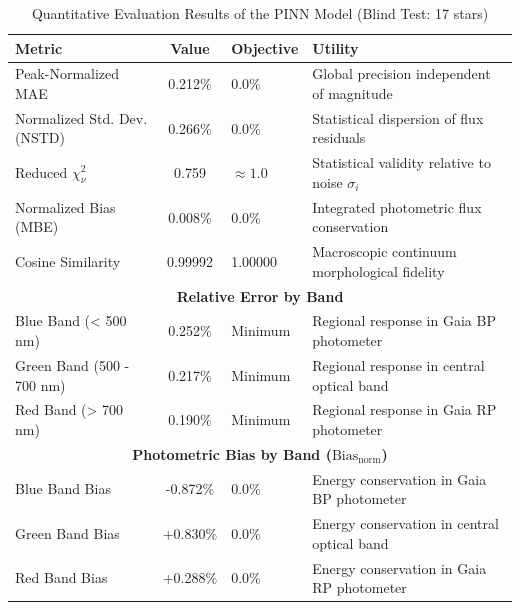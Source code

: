 
\begin{table}[htpb]
\centering
\caption{Quantitative Evaluation Results of the PINN Model (Blind Test: 17 stars)}
\label{tab:pinn_evaluation}
\begin{tabular}{lcll}
\hline
\textbf{Metric} & \textbf{Value} & \textbf{Objective} & \textbf{Utility} \\
\hline
Peak-Normalized MAE & 0.212\% & 0.0\% & Global precision independent of magnitude \\
Normalized Std. Dev. (NSTD) & 0.266\% & 0.0\% & Statistical dispersion of flux residuals \\
Reduced $\chi^2_\nu$ & 0.759 & $\approx 1.0$ & Statistical validity relative to noise $\sigma_i$ \\
Normalized Bias (MBE) & 0.008\% & 0.0\% & Integrated photometric flux conservation \\
Cosine Similarity & 0.99992 & 1.00000 & Macroscopic continuum morphological fidelity \\
\hline
\multicolumn{4}{c}{\textbf{Relative Error by Band}} \\
\hline
Blue Band (< 500 nm) & 0.252\% & Minimum & Regional response in Gaia BP photometer \\
Green Band (500 - 700 nm) & 0.217\% & Minimum & Regional response in central optical band \\
Red Band (> 700 nm) & 0.190\% & Minimum & Regional response in Gaia RP photometer \\
\hline
\multicolumn{4}{c}{\textbf{Photometric Bias by Band ($\text{Bias}_{\text{norm}}$)}} \\
\hline
Blue Band Bias & -0.872\% & 0.0\% & Energy conservation in Gaia BP photometer \\
Green Band Bias & +0.830\% & 0.0\% & Energy conservation in central optical band \\
Red Band Bias & +0.288\% & 0.0\% & Energy conservation in Gaia RP photometer \\
\hline
\end{tabular}
\end{table}
